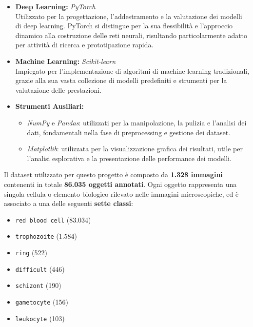 \documentclass[minted, draw]{../tex/hebdomon}
\begin{document}
\begin{itemize}
    \item \textbf{Deep Learning:} \textit{PyTorch} \\
    Utilizzato per la progettazione, l’addestramento e la valutazione dei modelli di deep learning. PyTorch si distingue per la sua flessibilità e l’approccio dinamico alla costruzione delle reti neurali, risultando particolarmente adatto per attività di ricerca e prototipazione rapida.

    \item \textbf{Machine Learning:} \textit{Scikit-learn} \\
    Impiegato per l’implementazione di algoritmi di machine learning tradizionali, grazie alla sua vasta collezione di modelli predefiniti e strumenti per la valutazione delle prestazioni.

    \item \textbf{Strumenti Ausiliari:}
    \begin{itemize}
        \item \textit{NumPy} e \textit{Pandas}: utilizzati per la manipolazione, la pulizia e l’analisi dei dati, fondamentali nella fase di preprocessing e gestione dei dataset.
        \item \textit{Matplotlib}: utilizzata per la visualizzazione grafica dei risultati, utile per l’analisi esplorativa e la presentazione delle performance dei modelli.
    \end{itemize}
\end{itemize}


Il dataset utilizzato per questo progetto è composto da \textbf{1.328 immagini} contenenti in totale \textbf{86.035 oggetti annotati}. Ogni oggetto rappresenta una singola cellula o elemento biologico rilevato nelle immagini microscopiche, ed è associato a una delle seguenti \textbf{sette classi}:

\begin{itemize}
    \item \texttt{red blood cell} (83.034)
    \item \texttt{trophozoite} (1.584)
    \item \texttt{ring} (522)
    \item \texttt{difficult} (446)
    \item \texttt{schizont} (190)
    \item \texttt{gametocyte} (156)
    \item \texttt{leukocyte} (103)
\end{itemize}
\end{document}
